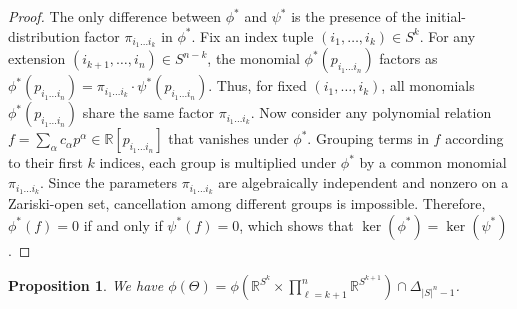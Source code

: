 \documentclass[11pt, a4paper]{article}
\numberwithin{equation}{section}
\theoremstyle{plain}
\newtheorem{proposition}[theorem]{Proposition}
\theoremstyle{definition}
\begin{document}
\begin{proof}
The only difference between $\phi^*$ and $\psi^*$ is the presence of the
initial-distribution factor $\pi_{i_1 \ldots i_k}$ in $\phi^*$.
Fix an index tuple $(i_1,\ldots,i_k) \in S^k$.
For any extension $(i_{k+1},\ldots,i_n) \in S^{n-k}$, the monomial
$\phi^*(p_{i_1 \ldots i_n})$ factors as
$\phi^*(p_{i_1 \ldots i_n})
=
\pi_{i_1 \ldots i_k}\cdot
\psi^*(p_{i_1 \ldots i_n}).$
Thus, for fixed $(i_1,\ldots,i_k)$, all monomials
$\phi^*(p_{i_1 \ldots i_n})$ share the same factor
$\pi_{i_1 \ldots i_k}$.
Now consider any polynomial relation
$\textstyle{f=\sum_{\alpha} c_\alpha p^\alpha \in \mathbb{R}[p_{i_1 \ldots i_n}]}$
that vanishes under $\phi^*$.
Grouping terms in $f$ according to their first $k$ indices,
each group is multiplied under $\phi^*$ by a common monomial
$\pi_{i_1 \ldots i_k}$.
Since the parameters $\pi_{i_1 \ldots i_k}$ are algebraically independent
and nonzero on a Zariski-open set, cancellation among different groups is
impossible.
Therefore, $\phi^*(f)=0$ if and only if $\psi^*(f)=0$,
which shows that $\ker(\phi^*)=\ker(\psi^*)$.
\end{proof}
\fi

\begin{proposition}\label{prop:equal_ideal_with_constraints}
We have $\phi(\Theta) = \phi \left(\mathbb{R}^{S^k} \times \prod_{\ell=k+1}^n \mathbb{R}^{S^{k+1}}\right)  \cap \Delta_{|S|^n-1}$.
\end{proposition}
\end{document}
